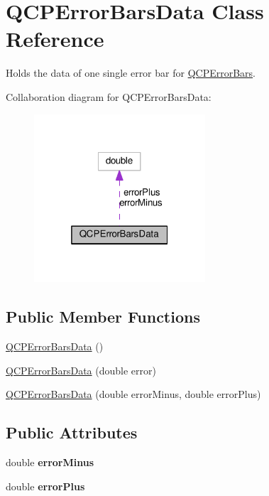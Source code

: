 \hypertarget{classQCPErrorBarsData}{}\section{Q\+C\+P\+Error\+Bars\+Data Class Reference}
\label{classQCPErrorBarsData}


Holds the data of one single error bar for \hyperlink{classQCPErrorBars}{Q\+C\+P\+Error\+Bars}.  




Collaboration diagram for Q\+C\+P\+Error\+Bars\+Data\+:
\nopagebreak
\begin{figure}[H]
\begin{center}
\leavevmode
\includegraphics[width=181pt]{classQCPErrorBarsData__coll__graph}
\end{center}
\end{figure}
\subsection*{Public Member Functions}
\begin{DoxyCompactItemize}
\item 
\hyperlink{classQCPErrorBarsData_ac18bdb46dec56f8df7f3c99d058cc725}{Q\+C\+P\+Error\+Bars\+Data} ()
\item 
\hyperlink{classQCPErrorBarsData_a73ebdaa55fa7f0052b70895b28edb444}{Q\+C\+P\+Error\+Bars\+Data} (double error)
\item 
\hyperlink{classQCPErrorBarsData_a7c61e42d87aea3312262d5429bc28387}{Q\+C\+P\+Error\+Bars\+Data} (double error\+Minus, double error\+Plus)
\end{DoxyCompactItemize}
\subsection*{Public Attributes}
\begin{DoxyCompactItemize}
\item 
double {\bfseries error\+Minus}\hypertarget{classQCPErrorBarsData_af8aaea160e52c14c57836224ee78020b}{}\label{classQCPErrorBarsData_af8aaea160e52c14c57836224ee78020b}

\item 
double {\bfseries error\+Plus}\hypertarget{classQCPErrorBarsData_ad1283c99fbfccf37a0226b1df52f0776}{}\label{classQCPErrorBarsData_ad1283c99fbfccf37a0226b1df52f0776}

\end{DoxyCompactItemize}


